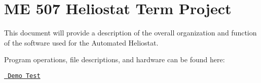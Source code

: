 \chapter{ME 507 Heliostat Term Project}
\hypertarget{index}{}\label{index}
This document will provide a description of the overall organization and function of the software used for the Automated Heliostat.

Program operations, file descriptions, and hardware can be found here\+:
\begin{DoxyItemize}
\item {}
\item {}
\item {}
\item {}
\item {}
\end{DoxyItemize}




\begin{DoxyItemize}
\item \href{https://www.youtube.com/watch?v=41eYMNxH7vk}{\texttt{ Demo Test}} 
\end{DoxyItemize}




